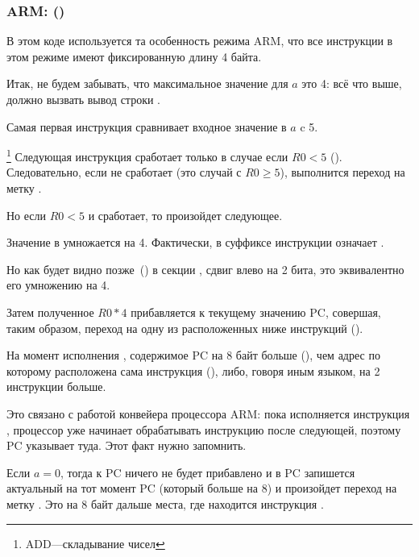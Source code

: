 \subsubsection{ARM: \OptimizingKeilVI (\ARMMode)}
\label{sec:SwitchARMLot}



В этом коде используется та особенность режима ARM, 
что все инструкции в этом режиме имеют фиксированную длину 4 байта.

Итак, не будем забывать, что максимальное значение для $a$ это 4: всё что выше, должно вызвать
вывод строки .

Самая первая инструкция  сравнивает входное значение в $a$ c 5.

\footnote{ADD---складывание чисел}
Следующая инструкция  сработает только в случае если $R0 < 5$ (). 
Следовательно, если  не сработает (это случай с $R0 \geq 5$), выполнится переход на метку 
.

Но если $R0 < 5$ и  сработает, то произойдет следующее.

Значение в  умножается на 4.
Фактически,  в суффиксе инструкции означает .

Но как будет видно позже~() в секции \q{\ShiftsSectionName}, 
сдвиг влево на 2 бита, это эквивалентно его умножению на 4.

Затем полученное $R0*4$ прибавляется к текущему значению \ac{PC}, 
совершая, таким образом, переход на одну из расположенных ниже инструкций  ().

На момент исполнения ,
содержимое \ac{PC} на 8 байт больше (), чем адрес по которому расположена сама инструкция  (), 
либо, говоря иным языком, на 2 инструкции больше.

Это связано с работой конвейера процессора ARM:
пока исполняется инструкция , процессор уже начинает обрабатывать инструкцию после следующей, 
поэтому \ac{PC} указывает туда. Этот факт нужно запомнить.

Если $a=0$, тогда к \ac{PC} ничего не будет прибавлено и 
в \ac{PC} запишется актуальный на тот момент \ac{PC} (который больше на 8) 
и произойдет переход на метку . 
Это на 8 байт дальше места, где находится инструкция .

